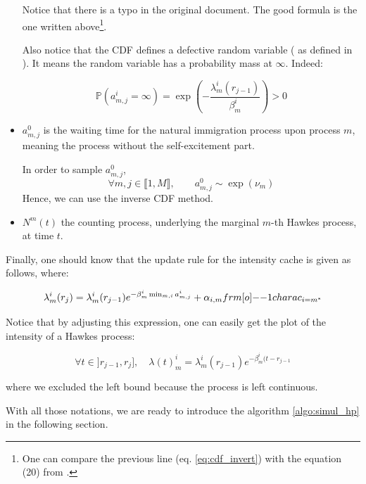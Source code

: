 \documentclass[11pt]{book}
\begin{document}
\begin{itemize}
Notice that there is a typo in the original document. The good formula is the one written above\footnote{One can compare the previous line (eq. \ref{eq:cdf_invert}) with the equation (20) from \cite{my_algo_simul}.}.

Also notice that the CDF defines a defective random variable ( as defined in \cite{my_algo_simul}). It means the random variable has a probability mass at $\infty$. Indeed:

$$ \mathbb P ( a^i_{m,j} = \infty ) = \exp \left ( - \frac { \lambda^i_m ( r_{j-1} ) } { \beta_m^i } \right ) > 0 $$



\item $a_{m,j}^0$ is the waiting time for the natural immigration process upon process $m$, meaning the process without the self-excitement part. 

\begin{remarque}
In order to sample $a^0_{m,j}$,
$$\forall m,j \in  \llbracket 1, M \rrbracket, \qquad a_{m,j}^0 \sim \exp( \nu_m )$$
Hence, we can use the inverse CDF method. 
\end{remarque}

\item $N^{m} (t) $ the counting process, underlying the marginal $m$-th Hawkes process, at time $t$.
\end{itemize}


Finally, one should know that the update rule for the intensity cache is given as follows, where:

\begin{equation}
\lambda_m^i ( r_j ) = \lambda_m^i ( r_{j-1} )  e^{ - \beta_m^i \min_{m,i} a_{m,j}^i } + \alpha_{i,m} \11charac_{i = m^*}
\label{eq:update_lambda} 
\end{equation}

Notice that by adjusting this expression, one can easily get the plot of the intensity of a Hawkes process:

\begin{equation}
\label{eq:update_lambda_plot} 
\forall t \in ]r_{j-1}, r_j ], \quad \lambda (t)_m^i = \lambda_m^i ( r_{j-1} )  e^{ - \beta_m^i ( t - r_{j-1} }
\end{equation} 

where we excluded the left bound because the process is left continuous.
 
With all those notations, we are ready to introduce the algorithm \ref{algo:simul_hp} in the following section.
\end{document}
